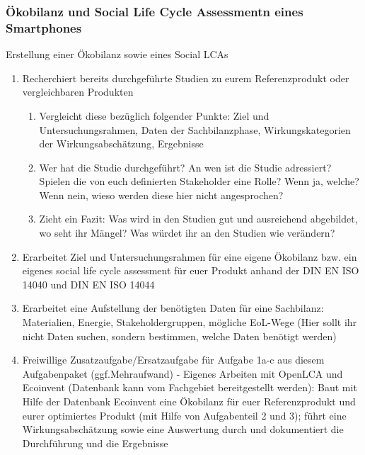 \documentclass[headinclude=true]{scrartcl}
\begin{document}
\subsubsection{Ökobilanz und Social Life Cycle Assessmentn eines Smartphones}
\label{ökobilanz}

Erstellung einer Ökobilanz sowie eines Social LCAs

\begin{enumerate}
	\item
	      Recherchiert bereits durchgeführte Studien zu eurem Referenzprodukt oder vergleichbaren Produkten

	      \begin{enumerate}
		      \item
		            Vergleicht diese bezüglich folgender Punkte: Ziel und
		            Untersuchungsrahmen, Daten der Sachbilanzphase, Wirkungskategorien
		            der Wirkungsabschätzung, Ergebnisse
		      \item
		            Wer hat die Studie durchgeführt? An wen ist die Studie adressiert?
		            Spielen die von euch definierten Stakeholder eine Rolle? Wenn ja, welche? Wenn nein, wieso werden
		            diese hier nicht angesprochen?
		      \item
		            Zieht ein Fazit: Was wird in den Studien gut und ausreichend abgebildet, wo seht ihr Mängel? Was würdet ihr an den Studien wie verändern?
	      \end{enumerate}
	\item
	      Erarbeitet Ziel und Untersuchungsrahmen für eine eigene Ökobilanz bzw.
	      ein eigenes social life cycle assessment für euer Produkt anhand der DIN EN ISO 14040 und DIN EN ISO 14044
	\item
	      Erarbeitet eine Aufstellung der benötigten Daten für eine Sachbilanz: Materialien, Energie, Stakeholdergruppen, mögliche EoL-Wege (Hier sollt ihr nicht Daten suchen, sondern bestimmen, welche Daten benötigt werden)
	\item
	      Freiwillige Zusatzaufgabe/Ersatzaufgabe für Aufgabe 1a-c aus diesem Aufgabenpaket (ggf.Mehraufwand) - Eigenes Arbeiten mit OpenLCA und Ecoinvent (Datenbank kann vom Fachgebiet bereitgestellt werden): Baut mit Hilfe der Datenbank Ecoinvent eine Ökobilanz für euer Referenzprodukt und eurer optimiertes Produkt (mit Hilfe von Aufgabenteil 2 und 3); führt eine Wirkungsabschätzung sowie eine Auswertung durch und dokumentiert die Durchführung und die Ergebnisse
\end{enumerate}
\end{document}
